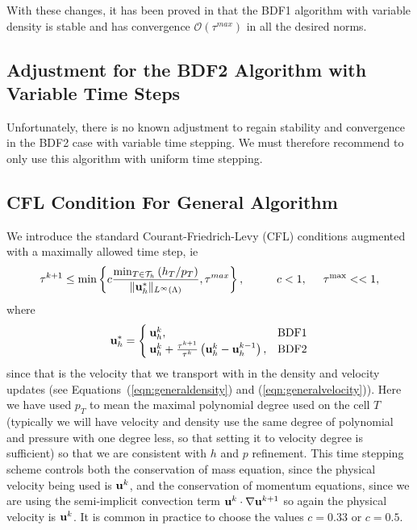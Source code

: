 \documentclass[letterpaper]{erdc}
\begin{document}
With these changes, it has been proved in \cite{bonito2015modified} that the
BDF1 algorithm with variable density is stable and has convergence
$\mathcal{O}(\tau^{max})$ in all the desired norms.


%
%
\subsection{Adjustment for the BDF2 Algorithm with Variable Time Steps}

Unfortunately, there is no known adjustment to regain stability and convergence
in the BDF2 case with variable time stepping.  We must therefore recommend to
only use this algorithm with uniform time stepping.




%
%
\subsection{CFL Condition For General Algorithm}
\label{sec:CFLgeneralalgorithm}

We introduce the standard Courant-Friedrich-Levy (CFL) conditions augmented
with a maximally allowed time step, ie
\begin{equation}
  \tau^{k+1} \leq \min \left\{c \frac{\min_{T\in\mathcal{T}_h}\left(h_{T}/p_T\right)}{\|\textbf{u}_h^{*}\|_{L^{\infty}(\Lambda)}}, \tau^{max}\right\}, \hspace{1cm} c<1, \hspace{0.5cm}\tau^{\max} << 1,
\end{equation}
where
\begin{equation}
  \ub_h^{*} = \begin{cases} \ub_h^{k}, & \mbox{BDF1}\\ \ub_h^{k}+ \frac{\tau^{k+1}}{\tau^{k}}\left(\ub_h^{k} - \ub_h^{k-1}\right),& $\mbox{BDF2}$ \end{cases}
\end{equation}
since that is the velocity that we transport with in the density and velocity
updates (see Equations~(\ref{eqn:generaldensity}) and
(\ref{eqn:generalvelocity})).  Here we have used $p_T$ to mean the maximal
polynomial degree used on the cell $T$ (typically we will have velocity and
density use the same degree of polynomial and pressure with one degree less, so
that setting it to velocity degree is sufficient) so that we are consistent
with $h$ and $p$ refinement.  This time stepping scheme controls both the
conservation of mass equation, since the physical velocity being used is
$\textbf{u}^{k}$, and the conservation of momentum equations, since we are using the
semi-implicit convection term $\textbf{u}^{k}\cdot\nabla\textbf{u}^{k+1}$ so again the
physical velocity is $\textbf{u}^{k}$.  It is common in practice to choose the values
$c=0.33$ or $c=0.5$.
\end{document}
